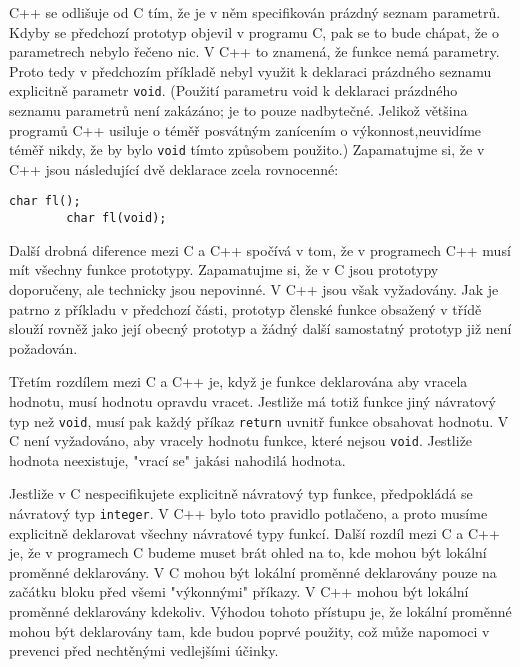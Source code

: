       C++ se odlišuje od C tím, že je v něm specifikován prázdný seznam parametrů. Kdyby se
      předchozí prototyp objevil v programu C, pak se to bude chápat, že o parametrech nebylo řečeno
      nic. V C++ to znamená, že funkce nemá parametry. Proto tedy v předchozím příkladě nebyl využit
      k deklaraci prázdného seznamu explicitně parametr \lstinline[style=luaCPPText]!void!. (Použití
      parametru void k deklaraci prázdného  seznamu parametrů není zakázáno; je to pouze nadbytečné.
      Jelikož většina programů C++ usiluje o téměř posvátným zanícením o výkonnost,neuvidíme téměř
      nikdy, že by bylo \lstinline[style=luaCPPText]!void! tímto způsobem použito.) Zapamatujme si,
      že v C++ jsou následující dvě deklarace zcela rovnocenné:
      \begin{lstlisting}[style=luaCPPStyle]
        char fl();
        char fl(void);
      \end{lstlisting}
  
      Další drobná diference mezi C a C++ spočívá v tom, že v programech C++ musí mít všechny 
      funkce prototypy. Zapamatujme si, že v C jsou prototypy doporučeny, ale technicky jsou 
      nepovinné. V C++ jsou však vyžadovány. Jak je patrno z příkladu v předchozí části, prototyp 
      členské funkce obsažený v třídě slouží rovněž jako její obecný prototyp a žádný další 
      samostatný prototyp již není požadován. 
      
      Třetím rozdílem mezi C a C++ je, když je funkce deklarována aby vracela hodnotu, musí hodnotu
      opravdu vracet. Jestliže má totiž funkce jiný návratový typ než
      \lstinline[style=luaCPPText]!void!, musí pak každý příkaz \lstinline[style=luaCPPText]!return!
      uvnitř funkce obsahovat hodnotu. V C není vyžadováno, aby vracely hodnotu funkce, které nejsou
      \lstinline[style=luaCPPText]!void!. Jestliže hodnota neexistuje, "vrací se" jakási nahodilá
      hodnota.
   
      Jestliže v C nespecifikujete explicitně návratový typ funkce, předpokládá se návratový typ
      \lstinline[style=luaCPPText]!integer!. V C++ bylo toto pravidlo potlačeno, a proto musíme
      explicitně deklarovat všechny návratové typy funkcí. Další rozdíl mezi C a C++ je, že v
      programech C budeme muset brát ohled na to, kde mohou být lokální proměnné deklarovány. V C
      mohou být lokální proměnné deklarovány pouze na začátku bloku před všemi "výkonnými" příkazy.
      V C++ mohou být lokální proměnné deklarovány kdekoliv. Výhodou tohoto přístupu je, že lokální
      proměnné mohou být deklarovány tam, kde budou poprvé použity, což může napomoci v prevenci
      před nechtěnými vedlejšími účinky.
  
